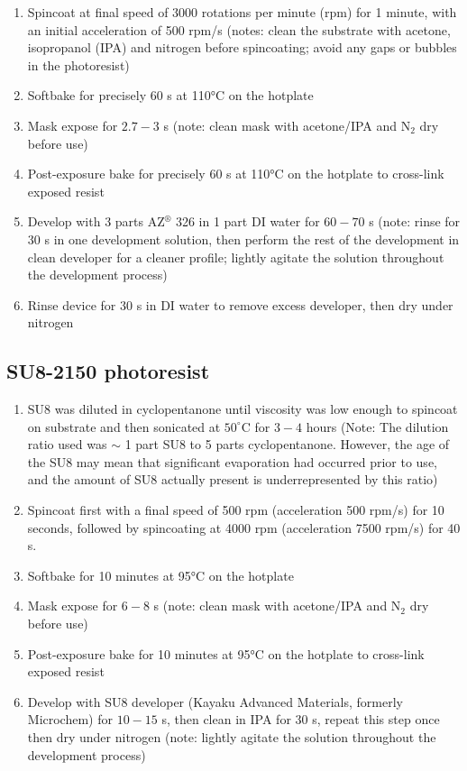 \documentclass[
  a4paper,
]{scrbook}
\begin{document}
\begin{enumerate}
\def\labelenumi{\arabic{enumi}.}
\item
  Spincoat at final speed of 3000 rotations per minute (rpm) for 1
  minute, with an initial acceleration of 500 rpm/s (notes: clean the
  substrate with acetone, isopropanol (IPA) and nitrogen before
  spincoating; avoid any gaps or bubbles in the photoresist)
\item
  Softbake for precisely 60 s at 110°C on the hotplate
\item
  Mask expose for \(2.7-3\) s (note: clean mask with acetone/IPA and
  N\(_2\) dry before use)
\item
  Post-exposure bake for precisely 60 s at 110°C on the hotplate to
  cross-link exposed resist
\item
  Develop with 3 parts AZ\(^\circledR\) 326 in 1 part DI water for
  \(60-70\) s (note: rinse for 30 s in one development solution, then
  perform the rest of the development in clean developer for a cleaner
  profile; lightly agitate the solution throughout the development
  process)
\item
  Rinse device for 30 s in DI water to remove excess developer, then dry
  under nitrogen
\end{enumerate}

\hypertarget{su8-2150-photoresist}{%
\subsection{SU8-2150 photoresist}\label{su8-2150-photoresist}}

\begin{enumerate}
\def\labelenumi{\arabic{enumi}.}
\item
  SU8 was diluted in cyclopentanone until viscosity was low enough to
  spincoat on substrate and then sonicated at \(50^\circ\)C for \(3-4\)
  hours (Note: The dilution ratio used was \(\sim\) 1 part SU8 to 5
  parts cyclopentanone. However, the age of the SU8 may mean that
  significant evaporation had occurred prior to use, and the amount of
  SU8 actually present is underrepresented by this ratio)
\item
  Spincoat first with a final speed of 500 rpm (acceleration 500 rpm/s)
  for 10 seconds, followed by spincoating at 4000 rpm (acceleration 7500
  rpm/s) for 40 s.
\item
  Softbake for 10 minutes at 95°C on the hotplate
\item
  Mask expose for \(6-8\) s (note: clean mask with acetone/IPA and
  N\(_2\) dry before use)
\item
  Post-exposure bake for 10 minutes at 95°C on the hotplate to
  cross-link exposed resist
\item
  Develop with SU8 developer (Kayaku Advanced Materials, formerly
  Microchem) for \(10-15\) s, then clean in IPA for 30 s, repeat this
  step once then dry under nitrogen (note: lightly agitate the solution
  throughout the development process)
\end{enumerate}
\end{document}
